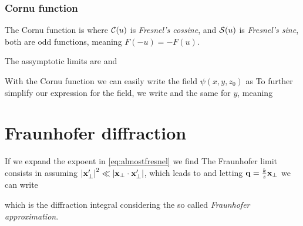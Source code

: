 \documentclass[oneside, 12pt, notitlepage]{book}
\begin{document}
\subsubsection{Cornu function}

The Cornu function is
where \(\mathcal{C}(u)\) is \emph{Fresnel's cossine}, and \(\mathcal{S}(u)\) is \emph{Fresnel's sine}, both are odd functions, meaning \(F(-u) = -F(u)\).\par

The assymptotic limits are
and
\par

With the Cornu function we can easily write the field \(\psi(x,y,z_0)\) as
To further simplify our expression for the field, we write
and the same for \(y\), meaning

\section{Fraunhofer diffraction}

If we expand the expoent in \eqref{eq:almostfresnel} we find
The Fraunhofer limit consists in assuming \(\abs{\vb{x}_{\perp}'}^2 \ll \abs{\vb{x}_{\perp}\cdot \vb{x}_{\perp}'}\), which leads to
and letting \(\vb{q} = \frac{k}{z}\vb{x}_{\perp}\)
we can write
\begin{tcolorbox}  \end{tcolorbox}
\noindent which is the diffraction integral considering the so called \emph{Fraunhofer approximation}.\par
\end{document}
